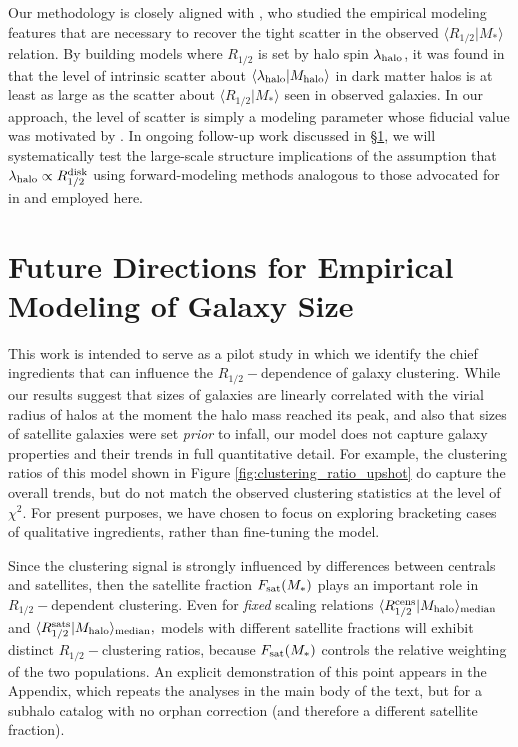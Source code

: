 \documentclass[usenatbib,usegraphicx,letterpaper]{mn2e}
\newcommand{\rhalf}{R_{1/2}}
\newcommand{\mstar}{M_{\ast}}
\newcommand{\mhalo}{M_{\rm halo}}
\newcommand{\mean}[2]{\langle{#1}\vert{#2}\rangle}
\newcommand{\median}[2]{\langle{#1}\vert{#2}\rangle_{\rm median}}
\begin{document}
Our methodology is closely aligned with \citet{somerville_etal17}, who studied the empirical modeling features that are necessary to recover the tight scatter in the observed $\mean{\rhalf}{\mstar}$ relation. By building models where $\rhalf$ is set by halo spin $\lambda_{\rm halo}$, it was found in \citet{somerville_etal17} that the level of intrinsic scatter about $\langle\lambda_{\rm halo}\vert\mhalo\rangle$ in dark matter halos is at least as large as the scatter about $\langle\rhalf\vert\mstar\rangle$ seen in observed galaxies. In our approach, the level of scatter is simply a modeling parameter whose fiducial value was motivated by \citet{somerville_etal17}. In ongoing follow-up work discussed in \S\ref{sec:future}, we will systematically test the large-scale structure implications of the assumption that $\lambda_{\rm halo}\propto\rhalf^{\rm disk}$ using forward-modeling methods analogous to those advocated for in \citet{somerville_etal17} and employed here.

\section{Future Directions for Empirical Modeling of Galaxy Size}
\label{sec:future}

This work is intended to serve as a pilot study in which we identify the chief ingredients that can influence the $\rhalf-$dependence of galaxy clustering. While our results suggest that sizes of galaxies are linearly correlated with the
virial radius of halos at the moment the halo mass reached its peak, and also that sizes of satellite galaxies were set {\em prior} to infall, our model does not capture galaxy properties and their trends in full quantitative detail.
For example, the clustering ratios of this model shown in Figure \ref{fig:clustering_ratio_upshot} do capture the overall trends, but do not match the observed clustering statistics at the level of $\chi^2.$ For present purposes, we have chosen to focus on exploring bracketing cases of qualitative ingredients, rather than fine-tuning the model.

Since the clustering signal is strongly influenced by differences between centrals and satellites, then the satellite fraction $F_{\rm sat}(\mstar)$ plays an important role in $\rhalf-$dependent clustering. Even for {\em fixed} scaling relations $\median{\rhalf^{\rm cens}}{\mhalo}$ and $\median{\rhalf^{\rm sats}}{\mhalo},$ models with different satellite fractions will exhibit distinct $\rhalf-$clustering ratios, because $F_{\rm sat}(\mstar)$ controls the relative weighting of the two populations. An explicit demonstration of this point appears in the Appendix, which repeats the analyses in the main body of the text, but for a subhalo catalog with no orphan correction (and therefore a different satellite fraction).
\end{document}
